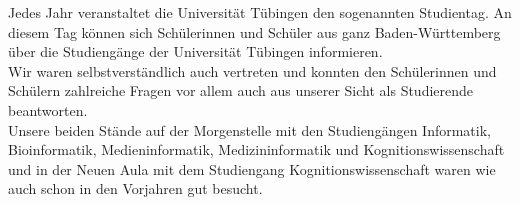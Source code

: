 Jedes Jahr veranstaltet die Universität Tübingen den sogenannten Studientag. An diesem Tag können sich Schülerinnen und Schüler aus ganz Baden-Württemberg über die Studiengänge der Universität Tübingen informieren.\\
Wir waren selbstverständlich auch vertreten und konnten den Schülerinnen und Schülern zahlreiche Fragen vor allem auch aus unserer Sicht als Studierende beantworten.\\
Unsere beiden Stände auf der Morgenstelle mit den Studiengängen Informatik, Bioinformatik, Medieninformatik, Medizininformatik und Kognitionswissenschaft und in der Neuen Aula mit dem Studiengang Kognitionswissenschaft waren wie auch schon in den Vorjahren gut besucht.